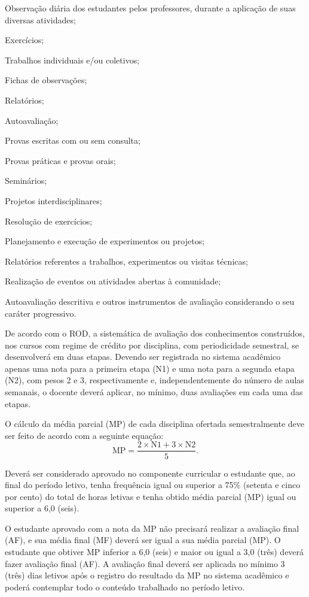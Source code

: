 \documentclass[
	12pt,				%
	openright,			%
	twoside,			%
	a4paper,			%
	chapter=TITLE,		%
	english,			%
	french,				%
	spanish,			%
	brazil,				%
	]{abntex2}
\begin{document}
\begin{alineas}
\item  Observação diária dos estudantes pelos professores, durante a aplicação de suas diversas atividades;  
\item  Exercícios;
\item Trabalhos individuais e/ou coletivos;
\item Fichas de observações;
\item Relatórios;
\item Autoavaliação;
\item Provas escritas com ou sem consulta;
\item  Provas práticas e provas orais;
\item  Seminários;
\item  Projetos interdisciplinares;
\item Resolução de exercícios;
\item Planejamento e execução de experimentos ou projetos;
\item Relatórios referentes a trabalhos, experimentos ou visitas técnicas;
\item Realização de eventos ou atividades abertas à comunidade;
\item Autoavaliação descritiva e outros instrumentos de avaliação considerando o seu caráter progressivo. 

\end{alineas}

De acordo com o ROD, a sistemática de avaliação dos conhecimentos construídos, nos cursos com regime de crédito por disciplina, com periodicidade semestral, se desenvolverá em duas etapas. Devendo ser registrada no sistema acadêmico apenas uma nota para a primeira etapa (N1) e uma nota para a segunda etapa (N2), com pesos 2 e 3, respectivamente e, independentemente do número de aulas semanais, o docente deverá aplicar, no mínimo, duas avaliações em cada uma das etapas.

O cálculo da média parcial (MP) de cada disciplina ofertada semestralmente deve ser feito de acordo com a seguinte equação:
\[
    \mathrm{MP} = \frac{2 \times \mathrm{N1} + 3 \times \mathrm{N2}}{5}.
\]

Deverá ser considerado aprovado no componente curricular o estudante que, ao final do período letivo, tenha frequência igual ou superior a 75\% (setenta e cinco por cento) do total de horas letivas e tenha obtido média parcial (MP) igual ou superior a 6,0 (seis). 

O estudante aprovado com a nota da MP não precisará realizar a avaliação final (AF), e sua média final (MF) deverá ser igual a sua média parcial (MP). O estudante que obtiver MP inferior a 6,0 (seis) e maior ou igual a 3,0 (três) deverá fazer avaliação final (AF). A avaliação final deverá ser aplicada no mínimo 3 (três) dias letivos após o registro do resultado da MP no sistema acadêmico e poderá contemplar todo o conteúdo trabalhado no período letivo.
\end{document}
